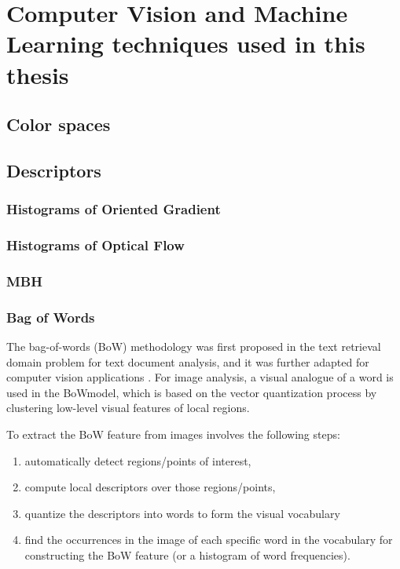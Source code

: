 
\chapter{Computer Vision and Machine Learning techniques used in this thesis}


\section{Color spaces}
\section{Descriptors}
\subsection{Histograms of Oriented Gradient}
\subsection{Histograms of Optical Flow}
\subsection{MBH}
\subsection{Bag of Words}
The bag-of-words (BoW) methodology was first proposed in the text retrieval domain problem for text document analysis, and it was further adapted for computer vision applications \cite{bosch2007best}. For image analysis, a visual analogue of a word is used in the BoWmodel, which is based on the vector quantization process by clustering low-level visual features of local regions. 

To extract the BoW feature from images involves the following steps: 
\begin{enumerate}
\item automatically detect regions/points of interest,
\item compute local descriptors over those regions/points,
\item quantize the descriptors into words to form the visual vocabulary
\item find the occurrences in the image of each specific word in the vocabulary for constructing the BoW feature (or a histogram of word frequencies).
\end{enumerate}


